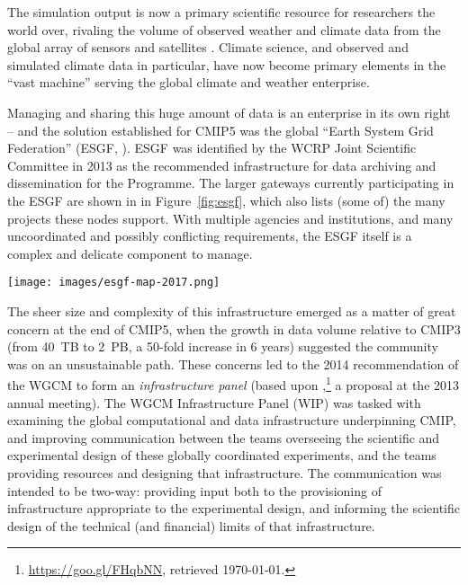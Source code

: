 \documentclass[gmd,manuscript]{copernicus}
\newcommand{\urlref}[2] {\href{#1}{#2}\footnote{\url{#1}, retrieved \today.}}
\begin{document}
The simulation output is now a primary scientific resource for
researchers the world over, rivaling the volume of observed weather
and climate data from the global array of sensors and satellites
\citep{ref:overpecketal2011}. Climate science, and observed and simulated
climate data in particular, have now become primary elements in the
``vast machine'' \citep{ref:edwards2010} serving the global climate and
weather enterprise.

Managing and sharing this huge amount of data is an enterprise in its
own right -- and the solution established for CMIP5 was the global
``Earth System Grid Federation'' (ESGF, \citep{ref:williamsetal2015}).
ESGF was identified by the WCRP Joint Scientific Committee in 2013 as
the recommended infrastructure for data archiving and dissemination
for the Programme. The larger gateways currently participating in the
ESGF are shown in in Figure~\ref{fig:esgf}, which also lists (some of) the
many projects these nodes support. With multiple agencies and
institutions, and many uncoordinated and possibly conflicting
requirements, the ESGF itself is a complex and delicate component to
manage.

\begin{figure*}
  \begin{center}
    \texttt{[image: images/esgf-map-2017.png]}
  \end{center}
  \caption{Sites participating in the Earth System Grid Federation in
    2017. Figure courtesy Dean Williams, adapted from the ESGF
    Brochure. }
  \label{fig:esgf}
\end{figure*}

The sheer size and complexity of this infrastructure emerged as a
matter of great concern at the end of CMIP5, when the growth in data
volume relative to CMIP3 (from 40~TB to 2~PB, a 50-fold increase in 6
years) suggested the community was on an unsustainable path. These
concerns led to the 2014 recommendation of the WGCM to form an
\emph{infrastructure panel} (based upon \urlref{https://goo.gl/FHqbNN},
a proposal at the 2013 annual meeting). The WGCM Infrastructure Panel
(WIP) was tasked with examining the global computational and data
infrastructure underpinning CMIP, and improving communication between
the teams overseeing the scientific and experimental design of these
globally coordinated experiments, and the teams providing resources
and designing that infrastructure. The communication was intended to
be two-way: providing input both to the provisioning of infrastructure
appropriate to the experimental design, and informing the scientific
design of the technical (and financial) limits of that infrastructure.
\end{document}
